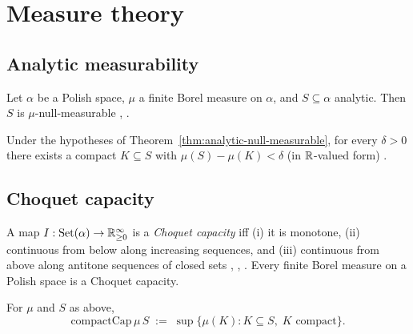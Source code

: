 \chapter{Measure theory}\label{chap:measure}

\section{Analytic measurability}\label{sec:analytic-measurability}

\begin{thm}
\label{thm:analytic-null-measurable}
  \leanok
Let $\alpha$ be a Polish space, $\mu$ a finite Borel measure on
$\alpha$, and $S \subseteq \alpha$ analytic. Then $S$ is
$\mu$-null-measurable \cite[Thm 29.5]{kechris1995classical},
\cite[\S7.4.11]{bogachev2007}.
\end{thm}

\begin{thm}
\label{thm:analytic-inner-approx}
  \leanok
Under the hypotheses of Theorem~\ref{thm:analytic-null-measurable},
for every $\delta > 0$ there exists a compact $K \subseteq S$ with
$\mu(S) - \mu(K) < \delta$ (in $\mathbb{R}$-valued form)
\cite[Thm 17.11]{kechris1995classical}.
\end{thm}

\section{Choquet capacity}\label{sec:choquet-capacity}

\begin{defn}
\label{def:choquet-capacity}
  \leanok
A map $I : \mathrm{Set}(\alpha) \to \mathbb{R}_{\ge 0}^\infty$ is a
\emph{Choquet capacity} iff (i) it is monotone, (ii) continuous from
below along increasing sequences, and (iii) continuous from above
along antitone sequences of closed sets
\cite{choquet1955}, \cite[Defn 30.1]{kechris1995classical},
\cite[III.1]{dellacherie-meyer}.
Every finite Borel measure on a Polish space is a Choquet capacity.
\end{defn}

\begin{defn}
\label{def:compact-cap}
  \leanok
For $\mu$ and $S$ as above,
\[
  \mathrm{compactCap}\,\mu\,S \;:=\; \sup \{ \mu(K) : K \subseteq S,\; K \text{ compact} \}.
\]
\end{defn}

